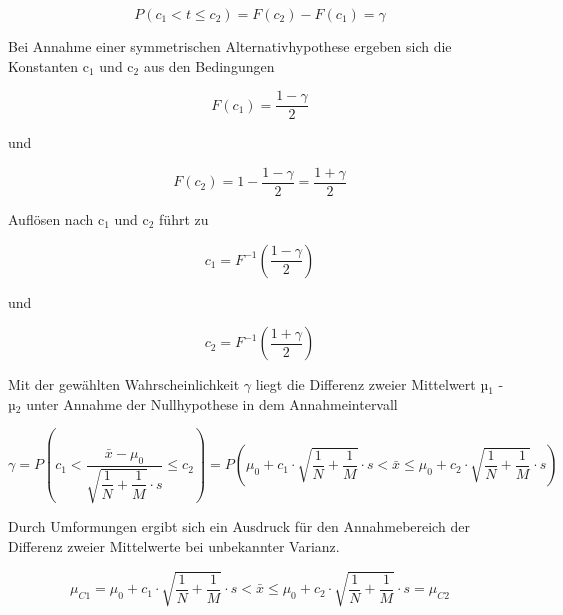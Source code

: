 \begin{equation}\label{eq:sixonehundredtwentysix}
P\left(c_{1} <t\le c_{2} \right)=F(c_{2})-F(c_{1})=\gamma
\end{equation}

\noindent Bei Annahme einer symmetrischen Alternativhypothese ergeben sich die Konstanten c${}_{1}$ und c${}_{2}$ aus den Bedingungen

\begin{equation}\label{eq:sixonehundredtwentyseven}
F\left(c_{1} \right)=\dfrac{1-\gamma }{2}
\end{equation}

\noindent und 

\begin{equation}\label{eq:sixonehundredtwentyeight}
F(c_{2})=1-\dfrac{1-\gamma }{2} =\dfrac{1+\gamma }{2}
\end{equation}

\noindent Aufl\"{o}sen nach c${}_{1}$ und c${}_{2}$ f\"{u}hrt zu

\begin{equation}\label{eq:sixonehundredtwentynine}
c_{1} =F^{-1} \left(\dfrac{1-\gamma }{2} \right)
\end{equation}

\noindent und

\begin{equation}\label{eq:sixonehundredthirty}
c_{2} =F^{-1} \left(\dfrac{1+\gamma }{2} \right)
\end{equation}

\noindent Mit der gew\"{a}hlten Wahrscheinlichkeit $\gamma$ liegt die Differenz zweier Mittelwert µ$_{1}$ - µ$_{2}$ unter Annahme der Nullhypothese in dem Annahmeintervall

\begin{equation}\label{eq:sixonehundredthirtyone}
\gamma =P\left(c_{1} <\dfrac{\bar{x}-\mu _{0} }{\sqrt{\dfrac{1}{N} +\dfrac{1}{M} } \cdot s} \le c_{2} \right)=P\left(\mu _{0} +c_{1} \cdot \sqrt{\dfrac{1}{N} +\dfrac{1}{M} } \cdot s<\bar{x}\le \mu _{0} +c_{2} \cdot \sqrt{\dfrac{1}{N} +\dfrac{1}{M} } \cdot s\right)
\end{equation}

\noindent Durch Umformungen ergibt sich ein Ausdruck f\"{u}r den Annahmebereich der Differenz zweier Mittelwerte bei unbekannter Varianz.

\begin{equation}\label{eq:sixonehundredthirtytwo}
\mu _{C1} =\mu _{0} +c_{1} \cdot \sqrt{\dfrac{1}{N} +\dfrac{1}{M} } \cdot s<\bar{x}\le \mu _{0} +c_{2} \cdot \sqrt{\dfrac{1}{N} +\dfrac{1}{M} } \cdot s=\mu _{C2}
\end{equation}

